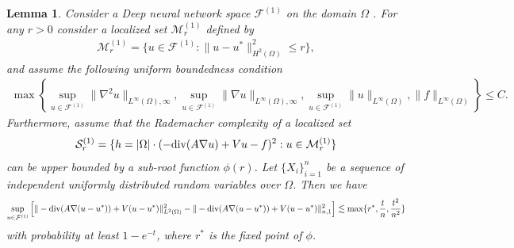 \documentclass{article}
\newcommand{\F}{\mathcal{F}}
\renewcommand{\div}{\textnormal{div}}
\theoremstyle{plain}
\newtheorem{lemma}[theorem]{Lemma}
\theoremstyle{definition}
\theoremstyle{remark}
\begin{document}
\begin{lemma} \label{bounding_generalizaiton1}
   Consider a Deep neural network space $\F^{(1)}$ on the domain $\Omega$ . For any $r > 0$ consider a localized set $\mathcal{M}_r^{(1)}$ defined by 
    \begin{align*}
        \mathcal{M}_r^{(1)} = \{u \in \F^{(1)}: \|u-u^*\|_{H^2(\Omega)}^2 \leq r\},
    \end{align*}
    and assume the following uniform boundedness condition 
    \begin{align*}
        \max \left\{ \sup_{u \in \F^{(1)}} \|\nabla^2 u\|_{L^\infty(\Omega), \infty}, \sup_{u \in \F^{(1)}} \|\nabla u\|_{L^\infty(\Omega), \infty}, \sup_{u \in \F^{(1)}} \| u\|_{L^\infty(\Omega)}, \|f\|_{L^\infty(\Omega)}\right\} \leq C.
    \end{align*}
    Furthermore, assume that the Rademacher complexity of a localized set 
    \begin{align*}
        \mathcal{S}_r^{(1)} = \{h = |\Omega|\cdot(-\div(A \nabla u) + V u  -f )^2: u \in \mathcal{M}_r^{(1)}\}
    \end{align*}
    can be upper bounded by a sub-root function $\phi(r)$. Let $\{X_i\}_{i=1}^n$ be a sequence of independent uniformly distributed random variables over $\Omega$. Then we have 
    \begin{align*}
        \sup_{u \in \F^{(1)}} \left[ \|-\div(A \nabla (u-u^*)) + V(u-u^*) \|_{L^2(\Omega)}^2 - \|-\div(A \nabla (u-u^*)) + V(u-u^*) \|_{n, 1}^2  \right]\lesssim   \max\{r^*, \frac{t}{n}, \frac{t^2}{n^2}\}
    \end{align*}
    with probability at least $1 - e^{-t}$, where $r^*$ is the fixed point of $\phi$. 
\end{lemma}
\end{document}
